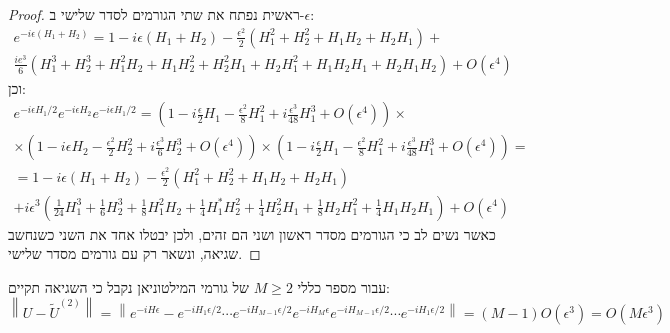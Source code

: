 \documentclass{tstextbook}
\begin{document}
\begin{proof}
ראשית נפתח את שתי הגורמים לסדר שלישי ב-\(\epsilon\):
$$\begin{gather}e^{-i\epsilon(H_{1}+H_{2})}=1-i\epsilon\left(H_{1}+H_{2}\right)-\frac{\epsilon^{2}}{2}\left(H_{1}^{2}+H_{2}^{2}+H_{1}H_{2}+H_{2}H_{1}\right)+\\ \frac{ie^{3}}{6}\left(H_{1}^{3}+H_{2}^{3}+H_{1}^{2}H_{2}+H_{1}H_{2}^{2}+H_{2}^{2}H_{1}+H_{2}H_{1}^{2}+H_{1}H_{2}H_{1}+H_{2}H_{1}H_{2}\right)+O\left(\epsilon^{4}\right) 
\end{gather}$$
וכן:
$$\begin{gather}e^{-i\epsilon H_{1}/2}e^{-i\epsilon H_{2}}e^{-i\epsilon H_{1}/2}=\left(1-i\frac{\epsilon}{2}H_{1}-\frac{\epsilon^{2}}{8}H_{1}^{2}+i\frac{\epsilon^{3}}{48}H_{1}^{3}+O\left(\epsilon^{4}\right)\right)\times\\ \times\left(1-i\epsilon H_{2}-\frac{\epsilon^{2}}{2}H_{2}^{2}+i\frac{\epsilon^{3}}{6}H_{2}^{3}+O\left(\epsilon^{4}\right)\right)\times\left(1-i\frac{\epsilon}{2}H_{1}-\frac{\epsilon^{2}}{8}H_{1}^{2}+i\frac{\epsilon^{3}}{48}H_{1}^{3}+O\left(\epsilon^{4}\right)\right)=\\=1-i\epsilon\left(H_{1}+H_{2}\right)-\frac{\epsilon^{2}}{2}\left(H_{1}^{2}+H_{2}^{2}+H_{1}H_{2}+H_{2}H_{1}\right)\\+i\epsilon^{3}\left(\frac{1}{24}H_{1}^{3}+\frac{1}{6}H_{2}^{3}+\frac{1}{8}H_{1}^{2}H_{2}+\frac{1}{4}H_{1}^{*}H_{2}^{2}+\frac{1}{4}H_{2}^{2}H_{1}+\frac{1}{8}H_{2}H_{1}^{2}+\frac{1}{4}H_{1}H_{2}H_{1}\right)+O\left(\epsilon^{4}\right) 
\end{gather}$$
כאשר נשים לב כי הגורמים מסדר ראשון ושני הם זהים, ולכן יבטלו אחד את השני כשנחשב שגיאה, ונשאר רק עם גורמים מסדר שלישי.

\end{proof}
\begin{proposition}
עבור מספר כללי \(M\geq 2\) של גורמי המילטוניאן נקבל כי השגיאה תקיים:
$$\left\lVert  U-\widetilde{U}^{(2)}  \right\rVert =\left\|e^{-iH\epsilon}-e^{-iH_{1}\epsilon/2}\cdots e^{-iH_{M-1}\epsilon/2}e^{-iH_{M}\epsilon}e^{-iH_{M-1}\epsilon/2}\cdots e^{-iH_{1}\epsilon/2}\right\|=\left(M-1\right)O\left(\epsilon^{3}\right)=O\left(M\epsilon^{3}\right)$$

\end{proposition}
\end{document}
